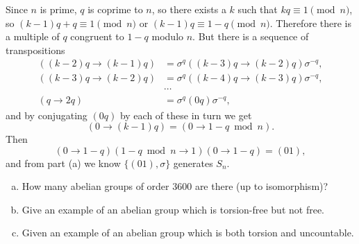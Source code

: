 \documentclass{article}
\newcounter{Problem}
\newenvironment{Problem}{\begin{Exercise}[name={Problem},
                                          counter={Problem}]}
                        {\end{Exercise}}
\begin{document}
\begin{Answer}
\begin{enumerate}
{    Since $n$ is prime, $q$ is coprime to $n$, so there exists a $k$
    such that $kq \equiv 1 \pmod{n}$, so  $(k - 1)q + q \equiv 1 \pmod{n}$ or
    $(k - 1)q \equiv 1 - q \pmod{n}$. Therefore there is a multiple of
    $q$ congruent to $1 - q$ modulo $n$. But there is a sequence of
    transpositions
    \begin{align*}
    ((k-2)q \to (k-1)q)
      &= \sigma^{q}((k-3)q \to (k-2)q)\sigma^{-q}, \\
    ((k-3)q \to (k-2)q)
      &= \sigma^{q}((k-4)q \to (k-3)q)\sigma^{-q}, \\
      &\cdots \\
    (q \to 2q)
      &= \sigma^{q}(0 q)\sigma^{-q},
    \end{align*}
    and by conjugating $(0q)$ by each of these in turn we get
    $$
    (0 \to (k - 1)q) = (0 \to 1 - q \bmod n).
    $$
    Then
    $$
    (0 \to 1 - q) (1 - q \bmod n \to 1) (0 \to 1 - q)
      = (01),
    $$
    and from part (a) we know $\{ (01), \sigma \}$ generates $S_n$.
  }
\end{enumerate}
\end{Answer}

\pagebreak

\begin{Problem}
\begin{enumerate}[(a)]
  \item{
    How many abelian groups of order 3600 are there (up to isomorphism)?
  }
  \item{
    Give an example of an abelian group which is torsion-free but not free.
  }
  \item{
    Given an example of an abelian group which is both torsion and uncountable.
  }
\end{enumerate}
\end{Problem}
\end{document}
